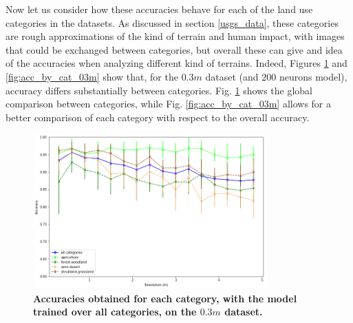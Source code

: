 Now let us consider how these accuracies behave for each of the land use categories in the datasets. As discussed in section \ref{usgs_data}, these categories are rough approximations of the kind of terrain and human impact, with images that could be exchanged between categories, but overall these can give and idea of the accuracies when analyzing different kind of terrains. Indeed, Figures \ref{fig:acc_all_cat_03m} and \ref{fig:acc_by_cat_03m} show that, for the $0.3m$ dataset (and $200$ neurons model), accuracy differs substantially between categories. Fig. \ref{fig:acc_all_cat_03m} shows the global comparison between categories, while Fig. \ref{fig:acc_by_cat_03m} allows for a better comparison of each category with respect to the overall accuracy. 

\begin{figure}[h!]
	\centering
	\includegraphics[width=0.8\textwidth]{Figures/results/acc_res_all_categories_03m.png}
	\captionsetup{width=1\linewidth}
	\caption{\textbf{Accuracies obtained for each category, with the model trained over all categories, on the $0.3m$ dataset.}}
	\label{fig:acc_all_cat_03m}
\end{figure}


